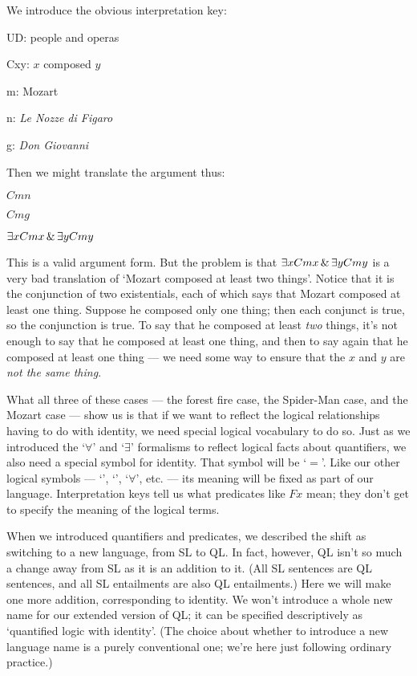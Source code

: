 We introduce the obvious interpretation key:

\begin{ekey}
\item[UD:] people and operas
\item[Cxy:] $x$ composed $y$
\item[m:] Mozart
\item[n:] \emph{Le Nozze di Figaro}
\item[g:] \emph{Don Giovanni}
\end{ekey}

Then we might translate the argument thus:

\begin{earg}
\item[] $Cmn$
\item[] $Cmg$
\item[\therefore] $\exists x Cmx \,\&\, \exists y Cmy$
\end{earg}

This is a valid argument form. But the problem is that $\exists x Cmx \,\&\, \exists y Cmy$ is a very bad translation of `Mozart composed at least two things'. Notice that it is the conjunction of two existentials, each of which says that Mozart composed at least one thing. Suppose he composed only one thing; then each conjunct is true, so the conjunction is true. To say that he composed at least \emph{two} things, it's not enough to say that he composed at least one thing, and then to say again that he composed at least one thing --- we need some way to ensure that the $x$ and $y$ are \emph{not the same thing}.

What all three of these cases --- the forest fire case, the Spider-Man case, and the Mozart case --- show us is that if we want to reflect the logical relationships having to do with identity, we need special logical vocabulary to do so. Just as we introduced the `$\forall$' and `$\exists$' formalisms to reflect logical facts about quantifiers, we also need a special symbol for identity. That symbol will be `$=$'. Like our other logical symbols --- `\eif', `\enot', `$\forall$', etc. --- its meaning will be fixed as part of our language. Interpretation keys tell us what predicates like $Fx$ mean; they don't get to specify the meaning of the logical terms.

When we introduced quantifiers and predicates, we described the shift as switching to a new language, from SL to QL. In fact, however, QL isn't so much a change away from SL as it is an addition to it. (All SL sentences are QL sentences, and all SL entailments are also QL entailments.) Here we will make one more addition, corresponding to identity. We won't introduce a whole new name for our extended version of QL; it can be specified descriptively as `quantified logic with identity'. (The choice about whether to introduce a new language name is a purely conventional one; we're here just following ordinary practice.)

